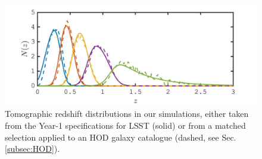 \begin{figure}
\includegraphics[width=\columnwidth]{graphs/Nz}
\caption{Tomographic redshift distributions in our simulations, either taken from the Year-1 specifications for LSST (solid) or from a matched selection applied to an HOD galaxy catalogue (dashed, see Sec. \ref{subsec:HOD}).}
\label{fig:Nz}
\end{figure}